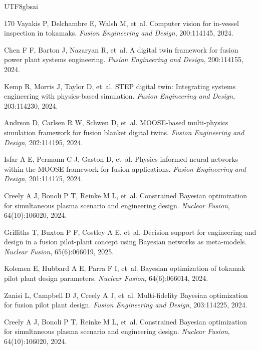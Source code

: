 \documentclass[12pt,a4paper]{article}
\begin{document}
\begin{CJK}{UTF8}{gbsai}
\begin{thebibliography}{170}
Vayakis P, Delchambre E, Walsh M, et~al.
\newblock Computer vision for in-vessel inspection in tokamaks.
\newblock \textit{Fusion Engineering and Design}, 200:114145, 2024.

Chen F F, Barton J, Nazaryan R, et~al.
\newblock A digital twin framework for fusion power plant systems engineering.
\newblock \textit{Fusion Engineering and Design}, 200:114155, 2024.

Kemp R, Morris J, Taylor D, et~al.
\newblock STEP digital twin: Integrating systems engineering with physics-based simulation.
\newblock \textit{Fusion Engineering and Design}, 203:114230, 2024.

Andrson D, Carlsen R W, Schwen D, et~al.
\newblock MOOSE-based multi-physics simulation framework for fusion blanket digital twins.
\newblock \textit{Fusion Engineering and Design}, 202:114195, 2024.

Isfar A E, Permann C J, Gaston D, et~al.
\newblock Physics-informed neural networks within the MOOSE framework for fusion applications.
\newblock \textit{Fusion Engineering and Design}, 201:114175, 2024.

Creely A J, Bonoli P T, Reinke M L, et~al.
\newblock Constrained Bayesian optimization for simultaneous plasma scenario and engineering design.
\newblock \textit{Nuclear Fusion}, 64(10):106020, 2024.

Griffiths T, Buxton P F, Costley A E, et~al.
\newblock Decision support for engineering and design in a fusion pilot-plant concept using Bayesian networks as meta-models.
\newblock \textit{Nuclear Fusion}, 65(6):066019, 2025.

Kolemen E, Hubbard A E, Parra F I, et~al.
\newblock Bayesian optimization of tokamak pilot plant design parameters.
\newblock \textit{Nuclear Fusion}, 64(6):066014, 2024.

Zanisi L, Campbell D J, Creely A J, et~al.
\newblock Multi-fidelity Bayesian optimization for fusion pilot plant design.
\newblock \textit{Fusion Engineering and Design}, 203:114225, 2024.

Creely A J, Bonoli P T, Reinke M L, et~al.
\newblock Constrained Bayesian optimization for simultaneous plasma scenario and engineering design.
\newblock \textit{Nuclear Fusion}, 64(10):106020, 2024.


\end{thebibliography}
\end{CJK}
\end{document}
